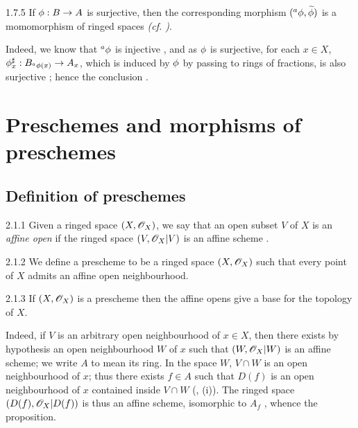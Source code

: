 \begin{envs}[Corollary]{1.7.5}
\label{cor-1.1.7.5}
If $\phi:B\to A$ is surjective, then the corresponding morphism
$({}^a\phi,\widetilde{\phi})$ is a momomorphism of ringed spaces
\emph{(cf. )}.
\end{envs}

Indeed, we know that ${}^a\phi$ is injective , and as $\phi$ is
surjective, for each $x\in X$, $\phi_x^\sharp:B_{{}^a\phi(x)}\to A_x$, which is induced
by $\phi$ by passing to rings of fractions, is also surjective ; hence
the conclusion .

\section{Preschemes and morphisms of preschemes}
\label{1-schemes-2}

\subsection{Definition of preschemes}
\label{1-schemes-2.1}

\begin{env}{2.1.1}
\label{env-1.2.1.1}
Given a ringed space $(X,\mathscr{O}_X)$, we say that an open subset
$V$ of $X$ is an \emph{affine open} if the ringed space $(V,\mathscr{O}_X|V)$ is an
affine scheme .
\end{env}

\begin{envs}[Definition]{2.1.2}
\label{defn-1.2.1.2}
We define a prescheme to be a ringed space
$(X,\mathscr{O}_X)$ such that every point of $X$ admits an affine open neighbourhood.
\end{envs}

\begin{envs}[Proposition]{2.1.3}
\label{prop-1.2.1.3}
If $(X,\mathscr{O}_X)$ is a prescheme then the affine opens give a base for the topology of $X$.
\end{envs}

Indeed, if $V$ is an arbitrary open neighbourhood of $x\in X$, then there
exists by hypothesis an open neighbourhood $W$ of $x$ such that $(W,\mathscr{O}_X|W)$ is
an affine scheme; we write $A$ to mean its ring. In the space $W$, $V\cap W$ is
an open neighbourhood of $x$; thus there exists $f\in A$ such that $D(f)$ is an
open neighbourhood of $x$ contained inside $V\cap W$ (, (i)). The ringed
space $(D(f),\mathscr{O}_X|D(f))$ is thus an affine scheme, isomorphic to $A_f$
, whence the proposition.

